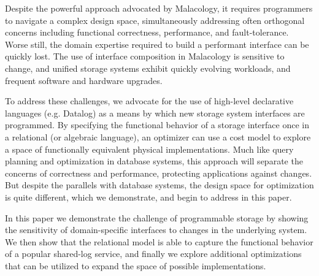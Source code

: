Despite the powerful approach advocated by Malacology, it requires programmers
to navigate a complex design space, simultaneously addressing often orthogonal
concerns including functional correctness, performance, and fault-tolerance.
Worse still, the domain expertise required to build a performant interface can
be quickly lost. The use of interface composition in Malacology is sensitive to
change, and unified storage systems exhibit quickly evolving workloads, and
frequent software and hardware upgrades.

To address these challenges, we advocate for the use of high-level declarative
languages (e.g. Datalog) as a means by which new storage system interfaces are
programmed. By specifying the functional behavior of a storage interface once
in a relational (or algebraic language), an optimizer can use a cost model to
explore a space of functionally equivalent physical implementations. Much like
query planning and optimization in database systems, this approach will
separate the concerns of correctness and performance, protecting applications
against changes. But despite the parallels with database systems, the design
space for optimization is quite different, which we demonstrate, and begin to
address in this paper.

In this paper we demonstrate the challenge of programmable storage by showing
the sensitivity of domain-specific interfaces to changes in the underlying
system. We then show that the relational model is able to capture the
functional behavior of a popular shared-log service, and finally we explore
additional optimizations that can be utilized to expand the space of
possible implementations.
